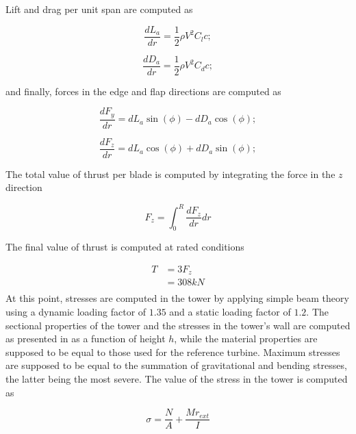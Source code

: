 Lift and drag per unit span are computed as

\begin{equation}
    \frac{dL_a}{dr} = \frac{1}{2} \rho V ^ 2 C_l c;
\end{equation}

\begin{equation}
    \frac{dD_a}{dr}  = \frac{1}{2} \rho V ^ 2 C_d c;
\end{equation}

and finally, forces in the edge and flap directions are computed as

\begin{equation}
    \frac{dF_y}{dr}  = dL_a \sin(\phi) - dD_a \cos(\phi);
\end{equation}

\begin{equation}
    \frac{dF_z}{dr}  = dL_a \cos(\phi) + dD_a \sin(\phi);
\end{equation}

The total value of thrust per blade is computed by integrating the force in the $z$ direction

\begin{equation}
    F_z = \int_{0}^{R} \frac{dF_z}{dr} dr
\end{equation}

The final value of thrust is computed at rated conditions

\begin{align}
    T &= 3 F_z \\
    &= 308 kN \\ \nonumber
\end{align}
At this point, stresses are computed in the tower by applying simple beam theory using a dynamic loading factor of $1.35$ and a static loading factor of $1.2$. The sectional properties of the tower and the stresses in the tower's wall are computed as presented in \cite{Bispl} as a function of height $h$, while the material properties are supposed to be equal to those used for the reference turbine. Maximum stresses are supposed to be equal to the summation of gravitational and bending stresses, the latter being the most severe. The value of the stress in the tower is computed as

\begin{equation}
    \sigma = \frac{N}{A} + \frac{M r_{ext}}{I}
\end{equation}

